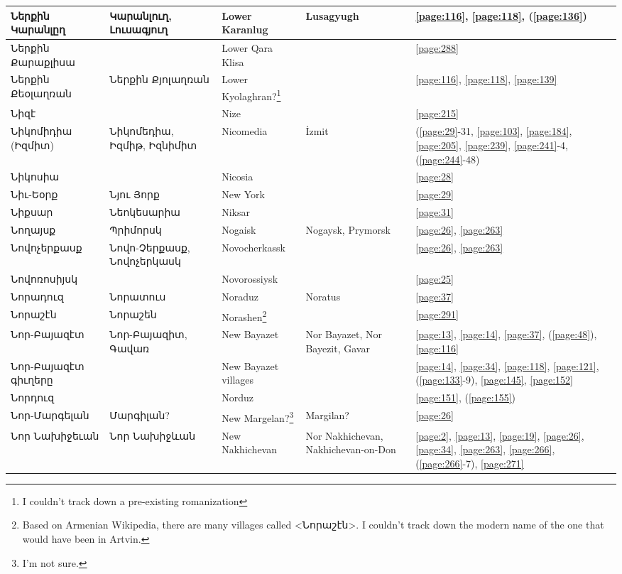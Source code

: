 \begin{center}
\begin{longtable}{|p{}|p{3cm}|p{3cm}|p{2cm}|p{3cm}|}
Ներքին Կարանլըղ&Կարանլուղ, Լուսագյուղ   & Lower Karanlug &  Lusagyugh &\ref{page:116}, \ref{page:118}, (\ref{page:136})\\ \hline
Ներքին Քարաքլիսա& &Lower Qara Klisa & &\ref{page:288}\\ \hline
Ներքին Քեօլաղռան&Ներքին Քյոլաղռան & Lower Kyolaghran?\footnote{I couldn't track down a pre-existing romanization} &&\ref{page:116}, \ref{page:118}, \ref{page:139}\\ \hline
Նիզէ& &Nize & &\ref{page:215}\\ \hline
Նիկոմիդիա (Իզմիտ)& Նիկոմեդիա, Իզմիթ, Իզնիմիտ&  Nicomedia  & İzmit&(\ref{page:29}-31, \ref{page:103}, \ref{page:184}, \ref{page:205}, \ref{page:239}, \ref{page:241}-4, (\ref{page:244}-48)\\ \hline
Նիկոսիա& &Nicosia & &\ref{page:28}\\ \hline
Նիւ-Եօրք& Նյու Յորք& New York& &\ref{page:29}\\ \hline
Նիքսար& Նեոկեսարիա&Niksar  & &\ref{page:31}\\ \hline
Նողայսք&Պրիմորսկ &Nogaisk &Nogaysk, Prymorsk &\ref{page:26}, \ref{page:263}\\ \hline
Նովոչերքասք&Նովո-Չերքասք, Նովոչերկասկ & Novocherkassk& &\ref{page:26}, \ref{page:263}\\ \hline
Նովոռոսիյսկ& &Novorossiysk & &\ref{page:25}\\ \hline
Նորադուզ&  Նորատուս  &Noraduz &Noratus &\ref{page:37}\\ \hline
Նորաշէն& Նորաշեն&Norashen\footnote{Based on Armenian Wikipedia, there are many villages called <Նորաշէն>. I couldn't track down the modern name of the one that would have been in Artvin.  }     & &\ref{page:291}\\ \hline
Նոր-Բայազէտ& Նոր-Բայազիտ, Գավառ& New Bayazet&Nor Bayazet, Nor Bayezit, Gavar &\ref{page:13}, \ref{page:14}, \ref{page:37}, (\ref{page:48}), \ref{page:116}\\ \hline
Նոր-Բայազէտ գիւղերը& &New Bayazet villages & &\ref{page:14}, \ref{page:34}, \ref{page:118}, \ref{page:121}, (\ref{page:133}-9), \ref{page:145}, \ref{page:152}\\ \hline
Նորդուզ& &Norduz & &\ref{page:151}, (\ref{page:155})\\ \hline
Նոր-Մարգելան& Մարգիլան?& New Margelan?\footnote{I'm not sure.}& Margilan?&\ref{page:26}\\ \hline
Նոր Նախիջեւան& Նոր Նախիջևան&New Nakhichevan &Nor Nakhichevan,  Nakhichevan-on-Don&\ref{page:2}, \ref{page:13}, \ref{page:19}, \ref{page:26}, \ref{page:34}, \ref{page:263}, \ref{page:266}, (\ref{page:266}-7), \ref{page:271}\\ \hline

\end{longtable}
\end{center}
